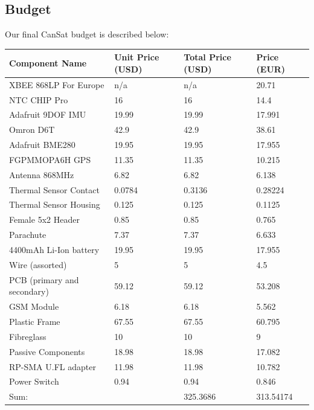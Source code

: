\documentclass[]{report}
\begin{document}
	\subsection{Budget}	
	Our final CanSat budget is described below:
	\begin{center}
		\begin{longtable}{llll}
			Component Name              & Unit Price (USD) & Total Price (USD) & Price (EUR) \\ \hline
			XBEE 868LP For Europe       & n/a              & n/a               & 20.71       \\
			NTC CHIP Pro                & 16               & 16                & 14.4        \\
			Adafruit 9DOF IMU           & 19.99            & 19.99             & 17.991      \\
			Omron D6T                   & 42.9             & 42.9              & 38.61       \\
			Adafruit BME280             & 19.95            & 19.95             & 17.955      \\
			FGPMMOPA6H GPS              & 11.35            & 11.35             & 10.215      \\
			Antenna 868MHz              & 6.82             & 6.82              & 6.138       \\
			Thermal Sensor Contact      & 0.0784           & 0.3136            & 0.28224     \\
			Thermal Sensor Housing      & 0.125            & 0.125             & 0.1125      \\
			Female 5x2 Header           & 0.85             & 0.85              & 0.765       \\
			Parachute                   & 7.37             & 7.37              & 6.633       \\
			4400mAh Li-Ion battery      & 19.95            & 19.95             & 17.955      \\
			Wire (assorted)             & 5                & 5                 & 4.5         \\
			PCB (primary and secondary) & 59.12            & 59.12             & 53.208      \\
			GSM Module                  & 6.18             & 6.18              & 5.562       \\
			Plastic Frame               & 67.55            & 67.55             & 60.795      \\
			Fibreglass                  & 10               & 10                & 9           \\
			Passive Components          & 18.98            & 18.98             & 17.082      \\
			RP-SMA U.FL adapter         & 11.98            & 11.98             & 10.782      \\
			Power Switch                & 0.94             & 0.94              & 0.846       \\ \hline
			Sum:                        &                  & 325.3686          & 313.54174   \\         
		\end{longtable}
	\end{center}
	
\end{document}
